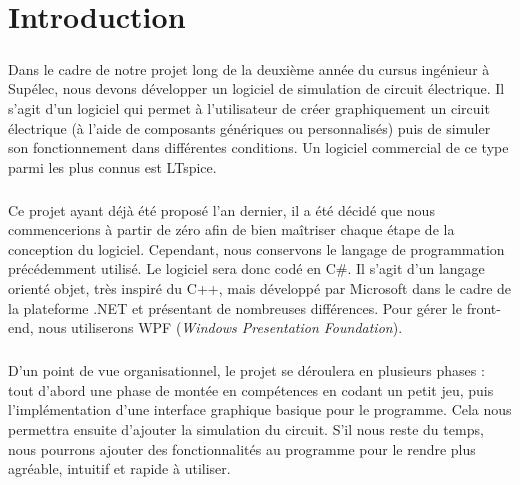 \chapter*{Introduction}

\paragraph{}Dans le cadre de notre projet long de la deuxième année du cursus ingénieur à Supélec, nous devons développer un logiciel de simulation de circuit électrique. Il s'agit d'un logiciel qui permet à l'utilisateur de créer graphiquement un circuit électrique (à l'aide de composants génériques ou personnalisés) puis de simuler son fonctionnement dans différentes conditions. Un logiciel commercial de ce type parmi les plus connus est LTspice.

\paragraph{}Ce projet ayant déjà été proposé l'an dernier, il a été décidé que nous commencerions à partir de zéro afin de bien maîtriser chaque étape de la conception du logiciel. Cependant, nous conservons le langage de programmation précédemment utilisé. Le logiciel sera donc codé en C\#. Il s'agit d'un langage orienté objet, très inspiré du C++, mais développé par Microsoft dans le cadre de la plateforme .NET et présentant de nombreuses différences. Pour gérer le front-end, nous utiliserons WPF (\textit{Windows Presentation Foundation}).

\paragraph{}D'un point de vue organisationnel, le projet se déroulera en plusieurs phases : tout d'abord une phase de montée en compétences en codant un petit jeu, puis l'implémentation d'une interface graphique basique pour le programme. Cela nous permettra ensuite d'ajouter la simulation du circuit. S'il nous reste du temps, nous pourrons ajouter des fonctionnalités au programme pour le rendre plus agréable, intuitif et rapide à utiliser.